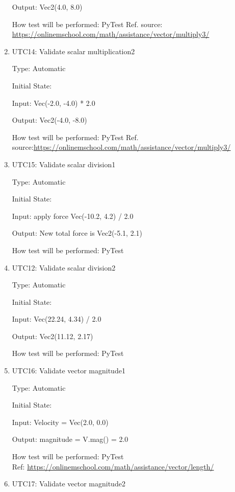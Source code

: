 \documentclass[12pt, titlepage]{article}
\begin{document}
\begin{enumerate}
	Output: Vec2(4.0, 8.0)
	
	How test will be performed: PyTest
	Ref. source: \url{https://onlinemschool.com/math/assistance/vector/multiply3/}
	
	\item{UTC14}{: Validate scalar multiplication2\\}
	
	Type: Automatic
	
	Initial State: 
	
	Input:  Vec(-2.0, -4.0) * 2.0
	
	Output:  Vec2(-4.0, -8.0)
	
	How test will be performed: PyTest
	Ref. source:\url{https://onlinemschool.com/math/assistance/vector/multiply3/}
	
	\item{UTC15}{: Validate scalar division1\\}
	
	Type: Automatic
	
	Initial State: 
	
	Input: apply force Vec(-10.2, 4.2) / 2.0
	
	Output: New total force is Vec2(-5.1, 2.1)
	
	How test will be performed: PyTest
	
	\item{UTC12}{: Validate scalar division2\\}
	
	Type: Automatic
	
	Initial State: 
	
	Input: Vec(22.24, 4.34) / 2.0
	
	Output: Vec2(11.12, 2.17)
	
	How test will be performed: PyTest
	
	\item{UTC16}{: Validate vector magnitude1\\}
	
	Type: Automatic
	
	Initial State: 
	
	Input: Velocity = Vec(2.0, 0.0)
	
	Output: magnitude = V.mag() = 2.0
	
	How test will be performed: PyTest\\
	Ref: \url{https://onlinemschool.com/math/assistance/vector/length/}
	
	\item{UTC17}{: Validate vector magnitude2\\}
	

\end{enumerate}
\end{document}
